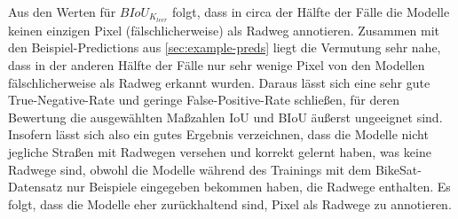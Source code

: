 Aus den Werten für $BIoU_{K_{leer}}$ folgt, dass in circa der Hälfte der Fälle die Modelle keinen einzigen Pixel 
(fälschlicherweise) als Radweg annotieren. Zusammen mit den Beispiel-Predictions aus \autoref{sec:example-preds} 
liegt die Vermutung sehr nahe, dass in der anderen Hälfte der Fälle nur sehr wenige Pixel von den Modellen 
fälschlicherweise als Radweg erkannt wurden. Daraus lässt sich eine sehr gute True-Negative-Rate und 
geringe False-Positive-Rate schließen, 
für deren Bewertung die ausgewählten Maßzahlen IoU und BIoU äußerst ungeeignet sind. Insofern lässt sich 
also ein gutes Ergebnis verzeichnen, dass die Modelle nicht jegliche Straßen mit Radwegen versehen und 
korrekt gelernt haben, was keine Radwege sind, obwohl die Modelle während des Trainings mit dem BikeSat-Datensatz 
nur Beispiele eingegeben bekommen haben, die Radwege enthalten. Es folgt, dass die Modelle eher zurückhaltend sind,
Pixel als Radwege zu annotieren.  

